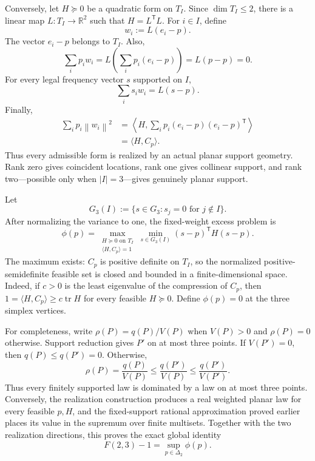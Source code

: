 \documentclass[11pt]{article}
\theoremstyle{definition}
\theoremstyle{remark}
\newcommand{\R}{\mathbb{R}}
\newcommand{\norm}[1]{\left\lVert #1\right\rVert}
\begin{document}
Conversely, let $H\succeq0$ be a quadratic form on $T_I$.  Since $\dim T_I\le2$, there is a linear map $L:T_I\to\R^2$ such that $H=L^{\mathsf T}L$.  For $i\in I$, define
\[
w_i:=L(e_i-p).
\]
The vector $e_i-p$ belongs to $T_I$.  Also,
\[
\sum_i p_iw_i
=L\left(\sum_i p_i(e_i-p)\right)
=L(p-p)=0.
\]
For every legal frequency vector $s$ supported on $I$,
\[
\sum_i s_iw_i=L(s-p).
\]
Finally,
\begin{align*}
\sum_i p_i\norm{w_i}^2
&=\left\langle H,
\sum_i p_i(e_i-p)(e_i-p)^{\mathsf T}\right\rangle\\
&=\langle H,C_p\rangle.
\end{align*}
Thus every admissible form is realized by an actual planar support geometry.  Rank zero gives coincident locations, rank one gives collinear support, and rank two---possible only when $|I|=3$---gives genuinely planar support.

Let
\[
G_3(I):=\{s\in G_3:s_j=0\text{ for }j\notin I\}.
\]
After normalizing the variance to one, the fixed-weight excess problem is
\begin{equation}
\phi(p)=
\max_{\substack{H\succeq0\text{ on }T_I\\
\langle H,C_p\rangle=1}}
\min_{s\in G_3(I)}(s-p)^{\mathsf T}H(s-p).
\label{eq:phi-primal-short}
\end{equation}
The maximum exists: $C_p$ is positive definite on $T_I$, so the normalized positive-semidefinite feasible set is closed and bounded in a finite-dimensional space.  Indeed, if $c>0$ is the least eigenvalue of the compression of $C_p$, then $1=\langle H,C_p\rangle\ge c\operatorname{tr}H$ for every feasible $H\succeq0$.  Define $\phi(p)=0$ at the three simplex vertices.

For completeness, write $\rho(P)=q(P)/V(P)$ when $V(P)>0$ and $\rho(P)=0$ otherwise.  Support reduction gives $P'$ on at most three points.  If $V(P')=0$, then $q(P)\le q(P')=0$.  Otherwise,
\[
\rho(P)=\frac{q(P)}{V(P)}
\le\frac{q(P')}{V(P)}
\le\frac{q(P')}{V(P')}.
\]
Thus every finitely supported law is dominated by a law on at most three points.  Conversely, the realization construction produces a real weighted planar law for every feasible $p,H$, and the fixed-support rational approximation proved earlier places its value in the supremum over finite multisets.  Together with the two realization directions, this proves the exact global identity
\begin{equation}
F(2,3)-1=\sup_{p\in\Delta_2}\phi(p).
\label{eq:rho-phi}
\end{equation}
\end{document}
